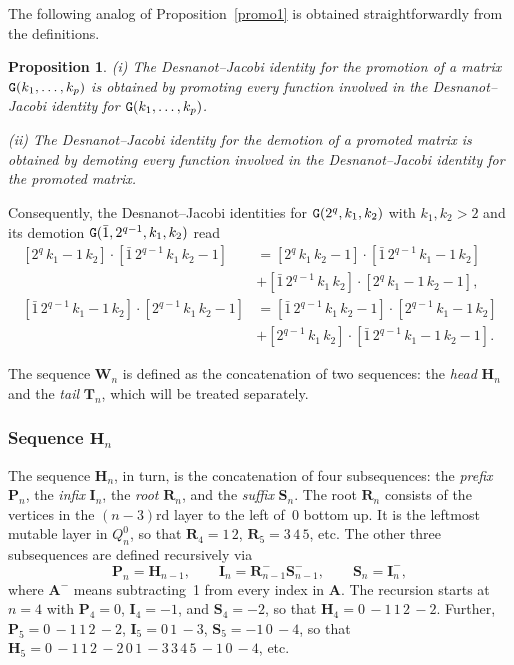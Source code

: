 \documentclass{amsart}
\newtheorem{proposition}[theorem]{Proposition}
\theoremstyle{definition}
\theoremstyle{remark}
\numberwithin{equation}{section}
\numberwithin{theorem}{section}
\def\Hs{\mathbf H}
\def\Is{\mathbf I}
\def\NG{{\tt G}}
\def\Ps{\mathbf P}
\def\Rs{\mathbf R}
\def\S{{\mathbf S}}
\def\Ts{\mathbf T}
\def\Ws{\mathbf W}
\begin{document}
The following analog of Proposition~\ref{promo1} is obtained straightforwardly from the definitions.
 
\begin{proposition}\label{promo2}
{\rm (i)} The Desnanot--Jacobi identity for the promotion of a matrix $\NG(k_1,\dots,k_{p})$ is obtained by promoting every function involved in the Desnanot--Jacobi identity for $\NG(k_1,\dots,k_p)$.

{\rm (ii)} The Desnanot--Jacobi identity for the demotion of a promoted matrix is obtained by demoting every function involved in the Desnanot--Jacobi identity for the promoted matrix.
\end{proposition}

Consequently, the Desnanot--Jacobi identities for $\NG(2^q,k_1,k_2)$ with $k_1,k_2>2$ and its demotion
$\NG(\bar1, 2^{q-1},k_1,k_2)$ read
\begin{equation}\label{promoDJ}
\begin{aligned}
[2^q\,k_1-1\,k_2]\cdot[\bar1\, 2^{q-1}\,k_1\,k_2-1]&=[2^q\,k_1\,k_2-1]\cdot[\bar1\,2^{q-1}\,k_1-1\,k_2]\\
&+[\bar1\,2^{q-1}\,k_1\,k_2]\cdot[2^q\,k_1-1\,k_2-1],\\
[\bar1\,2^{q-1}\,k_1-1\,k_2]\cdot[2^{q-1}\,k_1\,k_2-1]&=[\bar1\,2^{q-1}\,k_1\,k_2-1]\cdot[2^{q-1}\,k_1-1\,k_2]\\
&+[2^{q-1}\,k_1\,k_2]\cdot[\bar1\,2^{q-1}\,k_1-1\,k_2-1].
\end{aligned}
\end{equation}

The sequence $\Ws_n$ is defined as the concatenation of two sequences: the {\it head\/} $\Hs_n$ and the {\it tail\/} 
$\Ts_n$, which will be treated separately.

\subsubsection{Sequence $\Hs_n$} The sequence $\Hs_n$, in turn, is the concatenation of four subsequences: the {\it prefix\/} $\Ps_n$, the {\it infix\/} $\Is_n$, the {\it root\/} $\Rs_n$, and the {\it suffix\/} $\S_n$. The root $\Rs_n$ consists of the vertices in the $(n-3)$rd layer to the left of~0 bottom up. It is the leftmost mutable layer in
$Q_n^0$, so that $\Rs_4=1\, 2$, $\Rs_5=3\, 4\, 5$, etc.
The other three subsequences are defined recursively via
\[
\Ps_n=\Hs_{n-1},\qquad \Is_n=\Rs_{n-1}^-\S_{n-1}^-,\qquad \S_n=\Is_n^-,
\] 
where $\mathbf A^-$ means subtracting~1 from every index in $\mathbf A$. The recursion starts at $n=4$ with $\Ps_4=0$, 
$\Is_4=-1$, and $\S_4=-2$, so that $\Hs_4=0\, {-}1\, 1\, 2\, {-}2$. Further, $\Ps_5=0\, {-}1\, 1\, 2\, {-}2$, $\Is_5=0\, 1\, {-}3$, $\S_5={-}1 \, 0\, {-}4$, so that $\Hs_5=0\, {-}1\, 1\, 2\, {-}2\, 0\, 1\, {-}3\, 3\, 4\, 5\, {-}1 \, 0\, {-}4$, etc.
\end{document}
